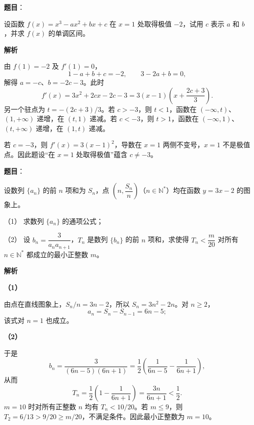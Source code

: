 \begin{answer}

\textbf{题目}：

设函数 $f(x)=x^3-ax^2+bx+c$ 在 $x=1$ 处取得极值 $-2$，试用 $c$ 表示 $a$ 和 $b$，并求 $f(x)$ 的单调区间。

\textbf{解析}

由 $f(1)=-2$ 及 $f'(1)=0$，
\nopagebreak[4]
\[
1-a+b+c=-2,\qquad 3-2a+b=0,
\]
解得 $a=-c$、$b=-2c-3$。此时
\nopagebreak[4]
\[
f'(x)=3x^2+2cx-2c-3=3(x-1)\left(x+\frac{2c+3}{3}\right).
\]
另一个驻点为 $t=-(2c+3)/3$。若 $c>-3$，则 $t<1$，函数在 $(-\infty,t)$、$(1,+\infty)$ 递增，在 $(t,1)$ 递减。若 $c<-3$，则 $t>1$，函数在 $(-\infty,1)$、$(t,+\infty)$ 递增，在 $(1,t)$ 递减。

若 $c=-3$，则 $f'(x)=3(x-1)^2$，导数在 $x=1$ 两侧不变号，$x=1$ 不是极值点。因此题设“在 $x=1$ 处取得极值”蕴含 $c\ne-3$。


\end{answer}
\begin{answer}

\textbf{题目}：

设数列 $\{a_n\}$ 的前 $n$ 项和为 $S_n$，点 $\left(n,\dfrac{S_n}{n}\right)$（$n\in\mathbb N^*$）均在函数 $y=3x-2$ 的图象上。

（1） 求数列 $\{a_n\}$ 的通项公式；

（2） 设 $b_n=\dfrac{3}{a_na_{n+1}}$，$T_n$ 是数列 $\{b_n\}$ 的前 $n$ 项和，求使得 $T_n<\dfrac m{20}$ 对所有 $n\in\mathbb N^*$ 都成立的最小正整数 $m$。

\textbf{解析}

\textbf{（1）}

由点在直线图象上，$S_n/n=3n-2$，所以 $S_n=3n^2-2n$。对 $n\geqslant2$，
\nopagebreak[4]
\[
a_n=S_n-S_{n-1}=6n-5;
\]
该式对 $n=1$ 也成立。

\textbf{（2）}

于是
\nopagebreak[4]
\[
b_n=\frac{3}{(6n-5)(6n+1)}
=\frac12\left(\frac1{6n-5}-\frac1{6n+1}\right),
\]
从而
\nopagebreak[4]
\[
T_n=\frac12\left(1-\frac1{6n+1}\right)=\frac{3n}{6n+1}<\frac12.
\]
$m=10$ 时对所有正整数 $n$ 均有 $T_n<10/20$。若 $m\leqslant9$，则 $T_2=6/13>9/20\geqslant m/20$，不满足条件。因此最小正整数为 $m=10$。



\end{answer}
